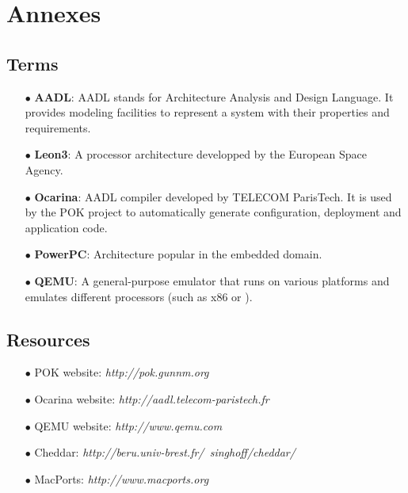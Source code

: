 %
%
%
%
%

\chapter{Annexes}

   \section{Terms}
   \begin{itemize}
      \item[$\bullet$] \textbf{AADL}: AADL stands for Architecture Analysis and
         Design Language. It provides modeling facilities to represent a system
         with their properties and requirements.

      \item[$\bullet$] \textbf{Leon3}: A processor architecture developped by
         the European Space Agency.

      \item[$\bullet$] \textbf{Ocarina}:
         AADL compiler developed by TELECOM ParisTech. It is used by the POK
         project to automatically generate configuration, deployment and
         application code.

      \item[$\bullet$] \textbf{PowerPC}:
         Architecture popular in the embedded domain.

      \item[$\bullet$] \textbf{QEMU}:
         A general-purpose emulator that runs on various platforms and emulates
         different processors (such as \intel x86 or \powerpc).
   \end{itemize}


   \section{Resources}
   \label{annex-url}
   \begin{itemize}
      \item[$\bullet$] POK website: \textit{http://pok.gunnm.org}
      \item[$\bullet$] Ocarina website: \textit{http://aadl.telecom-paristech.fr}
      \item[$\bullet$] QEMU website: \textit{http://www.qemu.com}
      \item[$\bullet$] Cheddar:
      \textit{http://beru.univ-brest.fr/~singhoff/cheddar/}
      \item[$\bullet$] MacPorts: \textit{http://www.macports.org}
   \end{itemize}

